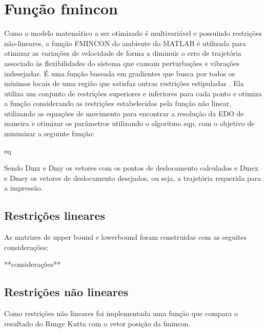 \section{Função fmincon}
Como o modelo matemático a ser otimizado é multivariável e 
possuindo restrições não-lineares, a função FMINCON do ambiente 
do MATLAB é utilizada para otimizar as variações de velocidade 
de forma a diminuir o erro de trajetória associado às 
flexibilidades do sistema que causam perturbações e vibrações 
indesejadas.
É uma função baseada em gradientes que busca por todos os 
mínimos locais de uma região que satisfaz outras restrições 
estipuladas \cite{albaghdadi21}.
Ela utiliza um conjunto de restrições superiores e inferiores 
para cada ponto e otimiza a função considerando as restrições 
estabelecidas pela função não linear, utilizando as equações de 
movimento para encontrar a resolução da EDO de maneira e 
otimizar os parâmetros utilizando o algoritmo sqp, com o 
objetivo de minimizar a seguinte função:

eq

Sendo Dmx e Dmy os vetores com os pontos de deslocamento 
calculados e Dmex e Dmey os vetores de deslocamento desejados, 
ou seja, a trajetória requerida para a impressão.

\subsection{Restrições lineares}
As matrizes de upper bound e lowerbound foram construidas com as seguites considerações:





**considerações**

\subsection{Restrições não lineares}
Como restrições não lineares foi implementada uma função que compara
o resultado do Runge Kutta com o vetor posição da fmincon.




